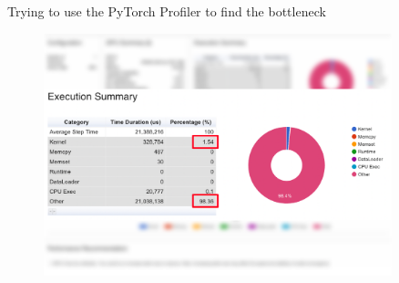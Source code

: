 \documentclass[compress,aspectratio=169]{beamer}
\begin{document}
\begin{frame}{Trying to use the PyTorch Profiler to find the bottleneck}
    \vspace{-1em}
    \begin{center}
    \begin{figure}
        \includegraphics[width=0.9\textwidth]{./assets/scap_gtx1080_profiler-torch_sample-points_14650750_execution-time}
    \end{figure}
    \end{center}
\end{frame}
\end{document}
